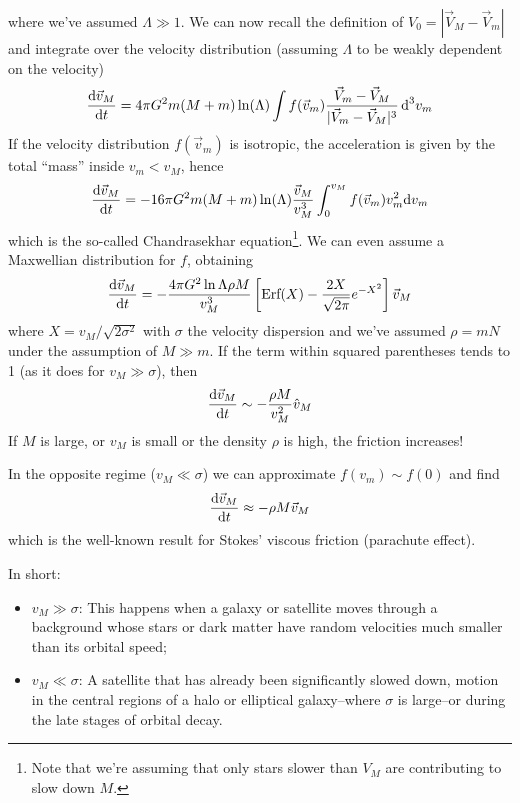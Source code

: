 where we've assumed $\Lambda \gg 1$. We can now recall the definition of $V_{0} = |\vec{V}_{M}-\vec{V}_{m}|$ and integrate over the velocity distribution (assuming $\Lambda$ to be weakly dependent on the velocity)
\begin{equation}
    \frac{\text{d}\vec{v}_{M}}{\text{d}t} = 4\pi G^{2}m(M+m)\ln(\Lambda)\int f(\vec{v}_{m})\frac{\vec{V}_{m}-\vec{V}_{M}}{|\vec{V}_{m}-\vec{V}_{M}|^{3}}\,\text{d}^{3}v_{m}
    \label{eq:Chandrasekharequation}
\end{equation}
If the velocity distribution $f(\vec{v}_{m})$ is isotropic, the acceleration is given by the total “mass” inside $v_{m}<v_{M}$, hence
\begin{equation*}
    \frac{\text{d}\vec{v}_{M}}{\text{d}t} = -16\pi G^{2}m(M+m)\ln(\Lambda)\frac{\vec{v}_{M}}{v_{M}^{3}}\int_{0}^{v_{M}} f(\vec{v}_{m})v_{m}^{2}\text{d}v_{m}
\end{equation*}
which is the so-called Chandrasekhar equation\footnote{Note that we're assuming that only stars slower than $V_{M}$ are contributing to slow down $M$.}. We can even assume a Maxwellian distribution for $f$, obtaining
\begin{equation}
    \frac{\text{d}\vec{v}_{M}}{\text{d}t} = -\frac{4\pi G^{2}\ln\Lambda \rho M}{v_{M}^{3}}\left[\text{Erf}(X)-\frac{2X}{\sqrt{2\pi}}e^{-X^{2}}\right]\vec{v}_{M}
    \label{eq:chandra_max}
\end{equation}
where $X = v_{M}/\sqrt{2\sigma^{2}}$ with $\sigma$ the velocity dispersion and we've assumed $\rho = mN$ under the assumption of $M\gg m$. If the term within squared parentheses tends to 1 (as it does for $v_{M}\gg \sigma$), then 
\begin{equation*}
    \frac{\text{d}\vec{v}_{M}}{\text{d}t} \sim -\frac{\rho M}{v_{M}^{2}}\hat{v}_{M}
\end{equation*}
If $M$ is large, or $v_{M}$ is small or the density $\rho$ is high, the friction increases!
\par In the opposite regime ($v_{M}\ll \sigma$) we can approximate $f(v_{m})\sim f(0)$ and find
\begin{equation*}
    \frac{\text{d}\vec{v}_{M}}{\text{d}t} \approx -\rho M \vec{v}_{M}
\end{equation*}
which is the well-known result for Stokes' viscous friction (parachute effect).
\par In short:
\begin{itemize}
    \item $v_{M}\gg \sigma$: This happens when a galaxy or satellite moves through a background whose stars or dark matter have random velocities much smaller than its orbital speed;
    \item $v_{M}\ll \sigma$: A satellite that has already been significantly slowed down, motion in the central regions of a halo or elliptical galaxy--where $\sigma$ is large--or during the late stages of orbital decay. 
\end{itemize}


